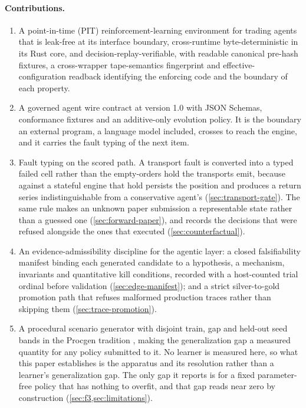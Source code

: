 \paragraph{Contributions.}
\begin{enumerate}[leftmargin=*,itemsep=2pt]
\item A point-in-time (PIT) reinforcement-learning environment for trading agents that is leak-free at its interface boundary, cross-runtime byte-deterministic in its Rust core, and decision-replay-verifiable, with readable canonical pre-hash fixtures, a cross-wrapper tape-semantics fingerprint and effective-configuration readback identifying the enforcing code and the boundary of each property.
\item A governed agent wire contract at version 1.0 with JSON Schemas, conformance fixtures and an additive-only evolution policy. It is the boundary an external program, a language model included, crosses to reach the engine, and it carries the fault typing of the next item.
\item Fault typing on the scored path. A transport fault is converted into a typed failed cell rather than the empty-orders hold the transports emit, because against a stateful engine that hold persists the position and produces a return series indistinguishable from a conservative agent's (\cref{sec:transport-gate}). The same rule makes an unknown paper submission a representable state rather than a guessed one (\cref{sec:forward-paper}), and records the decisions that were refused alongside the ones that executed (\cref{sec:counterfactual}).
\item An evidence-admissibility discipline for the agentic layer: a closed falsifiability manifest binding each generated candidate to a hypothesis, a mechanism, invariants and quantitative kill conditions, recorded with a host-counted trial ordinal before validation (\cref{sec:edge-manifest}); and a strict silver-to-gold promotion path that refuses malformed production traces rather than skipping them (\cref{sec:trace-promotion}).
\item A procedural scenario generator with disjoint train, gap and held-out seed bands in the Procgen tradition \citep{cobbe2020procgen}, making the generalization gap a measured quantity for any policy submitted to it. No learner is measured here, so what this paper establishes is the apparatus and its resolution rather than a learner's generalization gap. The only gap it reports is for a fixed parameter-free policy that has nothing to overfit, and that gap reads near zero by construction (\cref{sec:f3,sec:limitations}).

\end{enumerate}
